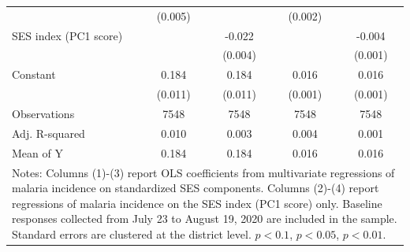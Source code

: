 {{\begin{tabular}{l*{4}{c}}
                &  (0.005)         &                  &  (0.002)         &                  \\
SES index (PC1 score)&                  &   -0.022\sym{***}&                  &   -0.004\sym{***}\\
                &                  &  (0.004)         &                  &  (0.001)         \\
Constant        &    0.184\sym{***}&    0.184\sym{***}&    0.016\sym{***}&    0.016\sym{***}\\
                &  (0.011)         &  (0.011)         &  (0.001)         &  (0.001)         \\
\hline
Observations    &\num{7548}         &\num{7548}         &\num{7548}         &\num{7548}         \\
Adj. R-squared  &    0.010         &    0.003         &    0.004         &    0.001         \\
Mean of Y       &    0.184         &    0.184         &    0.016         &    0.016         \\
\hline\hline
\multicolumn{5}{p{.87\linewidth}}{\scriptsize Notes: Columns (1)-(3) report OLS coefficients from multivariate regressions of malaria incidence on standardized SES components. Columns (2)-(4)  report regressions of malaria incidence on the SES index (PC1 score) only. Baseline responses collected from July 23 to August 19, 2020 are included in the sample. Standard errors are clustered at the district level. \sym{*} \(p<0.1\), \sym{**} \(p<0.05\), \sym{***} \(p<0.01\).}\\
\end{tabular}
}%

}
